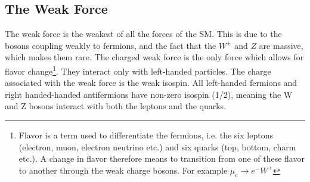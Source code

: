 \subsection{The Weak Force}
The weak force is the weakest of all the forces of the \ac{SM}. This is due to the bosons 
coupling weakly to fermions, and the fact that the $W^{\pm}$ and $Z$ are massive, which makes them rare. 
The charged weak force is the only force which allows for flavor change\footnote{Flavor is a term used to differentiate the 
fermions, i.e. the six leptons (electron, muon, electron neutrino etc.) and six quarks (top, bottom, charm etc.).
A change in flavor therefore means to transition from one of these flavor to another through the weak 
charge bosons. For example $\mu_e \rightarrow e^{-}W^+$ }. They interact only with left-handed particles. The charge associated with the weak force
is the weak isospin. All left-handed fermions and right handed-handed antifermions have non-zero isospin (1/2), 
meaning the W and Z bosons interact with both the leptons and the quarks.  